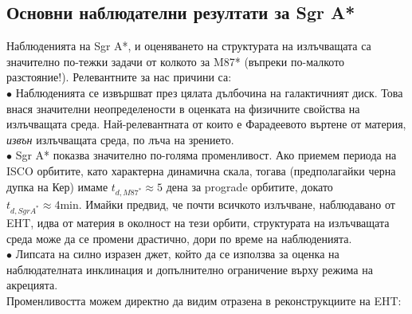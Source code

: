 \subsection{Основни наблюдателни резултати за Sgr A*}

Наблюденията на Sgr A*, и оценяването на структурата на излъчващата са значително по-тежки задачи от колкото за M87* (въпреки по-малкото разстояние!). Релевантните за нас причини са:\\\newline
$\bullet$ Наблюденията се извършват през цялата дълбочина на галактичният диск. Това внася значителни неопределености в оценката на физичните свойства на излъчващата среда. Най-релевантната от които е Фарадеевото въртене от материя, \emph{извън} излъчващата среда, по лъча на зрението.\\\newline
$\bullet$ Sgr A* показва значително по-голяма променливост. Ако приемем периода на ISCO орбитите, като характерна динамична скала, тогава (предполагайки черна дупка на Кер) имаме $t_{d,M87^*} \approx 5 $ дена за prograde орбитите, докато $t_{d,Sgr A^*}\approx 4 \text{min}$. Имайки предвид, че почти всичкото излъчване, наблюдавано от EHT, идва от материя в околност на тези орбити, структурата на излъчващата среда може да се промени драстично, дори по време на наблюденията. \\\newline
$\bullet$ Липсата на силно изразен джет, който да се използва за оценка на наблюдателната инклинация и допълнително ограничение върху режима на акрецията.\\\newline
Променливостта можем директно да видим отразена в реконструкциите на EHT:\\

